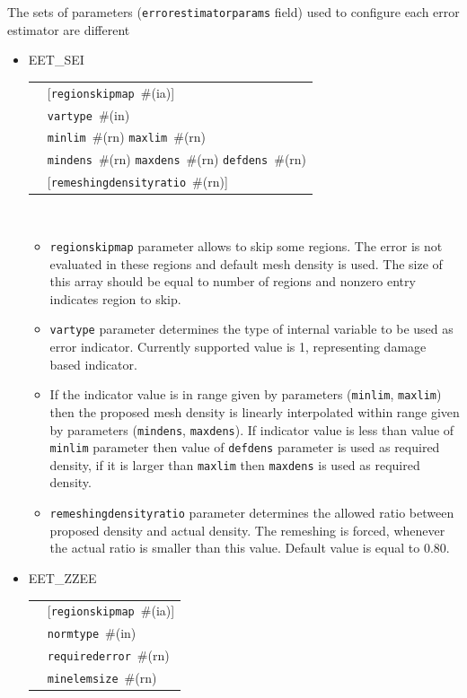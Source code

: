 \documentclass[a4paper]{article}
\makeatletter
\newcommand{\param}[1]{\texttt{#1}} %
\newcommand{\optional}[1]{[#1]} %
\newcommand{\field}[2]{\param{#1}~\#{\tiny(#2)}} %
\newcommand{\optField}[2]{\optional{\field{#1}{#2}}}
\newenvironment{record}[1][]{\begin{tabular}{|ll}}{\end{tabular}\\}
\newcommand{\recentry}[2]{{#1}&{#2}\\}
\newcounter{rcc}
\newenvironment{record}[1][\textwidth]{\setcounter{rcc}{0}\begin{tabular*}{#1}{|ll@{\extracolsep{\fill}}r}}{\end{tabular*}\\}
\newcommand{\recentry}[2]{\ifthenelse{\value{rcc}>0}{&$\backslash$ \\}{\setcounter{rcc}{1}}{#1}&{#2}}
\makeatother
\begin{document}
The sets of parameters (\param{errorestimatorparams} field) used to
configure each error estimator are different
\begin{itemize}
\item
EET\_SEI\\
\begin{record}[0.9\textwidth]
  \recentry{\hspace{2cm}}{\optField{regionskipmap}{ia}}
  \recentry{}{\field{vartype}{in}}
  \recentry{}{\field{minlim}{rn} \field{maxlim}{rn}}
  \recentry{}{\field{mindens}{rn} \field{maxdens}{rn} \field{defdens}{rn}}
  \recentry{}{\optField{remeshingdensityratio}{rn}}
\end{record}
\begin{itemize}
\item \param{regionskipmap} parameter allows to skip some regions. The
error is not evaluated in these regions and default mesh density is
used. The size of this array should be equal to number of regions and
nonzero entry indicates region to skip.
\item \param{vartype} parameter determines the type of internal
variable to be used as error indicator. Currently supported value is
1, representing damage based indicator.
\item If the indicator value is in range given by parameters (\param{minlim},
 \param{maxlim}) then the proposed mesh density is linearly
interpolated within range given by parameters (\param{mindens}, \param{maxdens}). If
indicator value is less than value of \param{minlim} parameter then
value of \param{defdens} parameter is used as
required density, if it is larger than \param{maxlim} then
\param{maxdens} is used as required density.
\item
\param{remeshingdensityratio} parameter determines the allowed ratio
between proposed density and actual density.
The remeshing is forced, whenever the actual ratio is smaller than
this value. Default value is equal to 0.80.
\end{itemize}
\item
EET\_ZZEE\\
\begin{record}[0.9\textwidth]
  \recentry{\hspace{2cm}}{\optField{regionskipmap}{ia}}
  \recentry{}{\field{normtype}{in}}
  \recentry{}{\field{requirederror}{rn}}
  \recentry{}{\field{minelemsize}{rn}}
\end{record}


\end{itemize}
\end{document}
